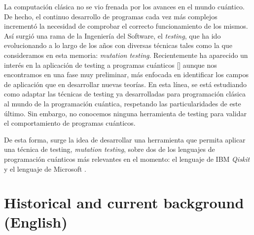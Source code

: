 La computación clásica no se vio frenada por los avances en el mundo cuántico. De hecho, el continuo desarrollo de programas cada vez más complejos incrementó la necesidad de comprobar el correcto funcionamiento de los mismos. Así surgió una  rama de la Ingeniería del Software, el \textit{testing}, que ha ido evolucionando a lo largo de los años con diversas técnicas tales como la que consideramos en esta memoria: \textit{mutation testing}. 
%
Recientemente ha aparecido  un interés en la aplicación de testing a programas cuánticos [\cite{usaolaquantum}] aunque nos encontramos en una fase muy preliminar, más enfocada en identificar los campos de aplicación que en desarrollar nuevas teorías. En esta línea, se está estudiando como  adaptar las técnicas de testing ya desarrolladas para programación clásica al mundo de la programación cuántica, respetando las particularidades de este último. 
%
Sin embargo, no conocemos ninguna herramienta de testing para validar el comportamiento de programas cuánticos.

De esta forma, surge la idea de desarrollar una herramienta que permita aplicar una  técnica de testing, \textit{mutation testing}, sobre dos de los lenguajes de programación cuánticos más relevantes en el momento: el lenguaje de IBM \textit{Qiskit} y el lenguaje de Microsoft \qsh.

\section{Historical and current background (English)}

